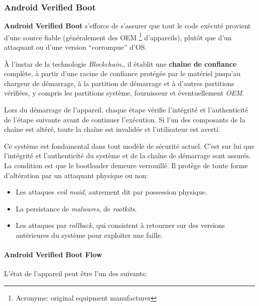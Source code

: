 \documentclass[
  french,
  paper=a4,
  ,captions=tableheading
]{scrartcl}
\providecommand{\tightlist}{%
  \setlength{\itemsep}{0pt}\setlength{\parskip}{0pt}}
\begin{document}
\hypertarget{android-verified-boot}{%
\subsubsection{Android Verified Boot}\label{android-verified-boot}}

\textbf{Android Verified Boot} s'efforce de s'assurer que tout le code
exécuté provient d'une source fiable (généralement des OEM \footnote{Acronyme:
  original equipment manufacturer} d'appareils), plutôt que d'un
attaquant ou d'une version ``corrompue'' d'OS.

À l'instar de la technologie \emph{Blockchain},, il établit une
\textbf{chaîne de confiance} complète, à partir d'une racine de
confiance protégée par le matériel jusqu'au chargeur de démarrage, à la
partition de démarrage et à d'autres partitions vérifiées, y compris les
partitions système, fournisseur et éventuellement \emph{OEM}.

Lors du démarrage de l'appareil, chaque étape vérifie l'intégrité et
l'authenticité de l'étape suivante avant de continuer l'exécution. Si
l'un des composants de la chaîne est altéré, toute la chaîne est
invalidée et l'utilisateur est averti.

Ce système est fondamental dans tout modèle de sécurité actuel. C'est
sur lui que l'intégrité et l'authenticité du système et de la chaîne de
démarrage sont assurés. La condition est que le bootloader demeure
verrouillé. Il protège de toute forme d'altération par un attaquant
physique ou non:

\begin{itemize}
\tightlist
\item
  Les attaques \emph{evil maid}, autrement dit par possession physique.
\item
  La persistance de \emph{malwares}, de \emph{rootkits}.
\item
  Les attaques par \emph{rollback}, qui consistent à retourner sur des
  versions antérieures du système pour exploiter une faille.
\end{itemize}

\hypertarget{android-verified-boot-flow}{%
\paragraph{Android Verified Boot
Flow}\label{android-verified-boot-flow}}

\begin{flushleft}
L'état de l'appareil peut être l'un des suivants:
\end{flushleft}
\end{document}
